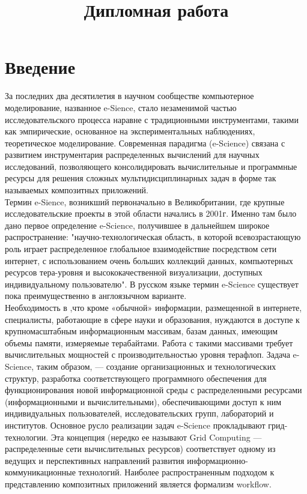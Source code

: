 \documentclass[a4paper,14pt]{article}
\title{Дипломная работа}
\begin{document}
\maketitle
\textwidth 15.5cm
\topmargin -1cm
\parindent 1cm
\textheight 24cm
\parskip 1.5mm



\section{Введение}

За последних два десятилетия в научном сообществе компьютерное моделирование, названное e-Sience, стало незаменимой частью исследовательского процесса наравне с традиционными инструментами, такими как эмпирические, основанное на  экспериментальных наблюдениях, 
теоретическое моделирование. Современная парадигма (e-Science) связана с развитием инструментария распределенных вычислений для научных исследований, позволяющего консолидировать вычислительные и программные ресурсы для решения сложных мультидисциплинарных задач в форме так называемых композитных приложений.\\ 

Термин e-Sience, возникший первоначально в Великобритании, где крупные исследовательские проекты в этой области начались в 2001г. Именно там было дано первое определение e-Science, получившее в дальнейшем широкое распространение: "научно-технологическая область, в которой всевозрастающую роль играет распределенное глобальное взаимодействие посредством сети интернет, с использованием очень больших коллекций данных, компьютерных ресурсов тера-уровня и высококачественной визуализации, доступных индивидуальному
пользователю". В русском языке термин e-Science существует пока преимущественно в англоязычном варианте.\\
 Необходимость в ,что кроме «обычной» информации, размещенной в интернете, специалисты, работающие в сфере науки и образования, нуждаются в доступе к крупномасштабным информационным массивам, базам данных, имеющим объемы памяти, измеряемые терабайтами. Работа с такими массивами
требует вычислительных мощностей с производительностью уровня терафлоп.  
Задача e-Science, таким образом, — создание организационных и технологических структур, разработка соответствующего программного обеспечения для функционирования новой информационной среды с
распределенными ресурсами (информационными и вычислительными), обеспечивающими доступ к ним индивидуальных пользователей, исследовательских групп, лабораторий и институтов.
Основное русло реализации задач e-Science прокладывают грид-технологии. Эта концепция (нередко ее называют Grid Computing — распределенные сети вычислительных ресурсов) соответствует
одному из ведущих и перспективных направлений развития информационно-коммуникационные технологий.
Наиболее распространенным подходом к представлению композитных приложений является формализм workflow. 
\end{document}
